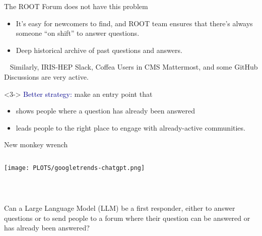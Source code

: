 \documentclass[aspectratio=169]{beamer}
\begin{document}
\begin{frame}{The ROOT Forum does not have this problem}
\large
\vspace{0.25 cm}

\begin{center}
\end{center}

\begin{itemize}
\item<2-> It's easy for newcomers to find, and ROOT team ensures that there's always someone ``on shift'' to answer questions.
\item<3-> Deep historical archive of past questions and answers.
\end{itemize}
\end{frame}

\begin{frame}{\mbox{ }}
\large
\vspace{0.5 cm}
Similarly, IRIS-HEP Slack, Coffea Users in CMS Mattermost, and some GitHub Discussions are very active.

\vspace{1 cm}

\vspace{1 cm}
\begin{uncoverenv}<3->
\textcolor{darkblue}{Better strategy:} make an entry point that

\vspace{0.25 cm}
\begin{itemize}
\item shows people where a question has already been answered
\item leads people to the right place to engage with already-active communities.
\end{itemize}
\end{uncoverenv}
\end{frame}

\begin{frame}{New monkey wrench}
\vspace{0.17 cm}
\begin{columns}
\texttt{[image: PLOTS/googletrends-chatgpt.png]}
\end{columns}
\end{frame}

\begin{frame}{\mbox{ }}
\Large
\vspace{1 cm}

Can a Large Language Model (LLM) be a first responder, either to answer questions or to send people to a forum where their question can be answered or has already been answered?

\vspace{0.5 cm}
\begin{center}
\end{center}
\end{frame}
\end{document}
